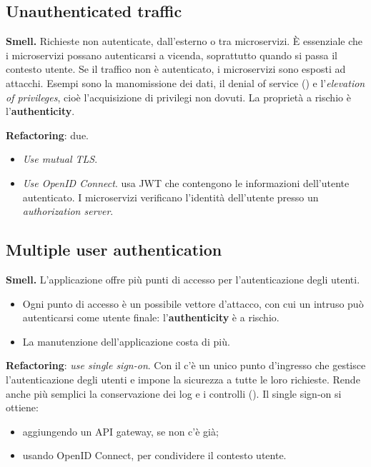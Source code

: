 \subsection{Unauthenticated traffic}

\textbf{Smell.} Richieste non autenticate, dall'esterno o tra microservizi. È essenziale che i microservizi possano
autenticarsi a vicenda, soprattutto quando si passa il contesto utente. Se il traffico non è autenticato, i
microservizi sono esposti ad attacchi. Esempi sono la manomissione dei dati, il denial of service () e
l'\emph{elevation of privileges}, cioè l'acquisizione di privilegi non dovuti. La proprietà a rischio è
l'\textbf{authenticity}.

\textbf{Refactoring}: due.
\begin{itemize}
  \item \emph{Use mutual TLS}.
  \item \emph{Use OpenID Connect}.  usa JWT che contengono le informazioni dell'utente
    autenticato. I microservizi verificano l'identità dell'utente presso un \emph{authorization server}.
\end{itemize}

\subsection{Multiple user authentication}

\textbf{Smell.} L'applicazione offre più punti di accesso per l'autenticazione degli utenti.
\begin{itemize}
  \item Ogni punto di accesso è un possibile vettore d'attacco, con cui un intruso può autenticarsi come utente finale:
    l'\textbf{authenticity} è a rischio.
  \item La manutenzione dell'applicazione costa di più.
\end{itemize}

\textbf{Refactoring}: \emph{use single sign-on}. Con il  c'è un unico punto d'ingresso che
gestisce l'autenticazione degli utenti e impone la sicurezza a tutte le loro richieste. Rende anche più semplici la
conservazione dei log e i controlli (). Il single sign-on si ottiene:
\begin{itemize}
  \item aggiungendo un API gateway, se non c'è già;
  \item usando OpenID Connect, per condividere il contesto utente.
\end{itemize}

